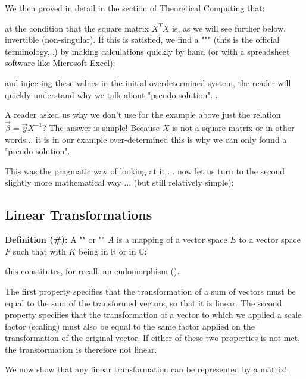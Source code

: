We then proved in detail in the section of Theoretical Computing that:
	

at the condition that the square matrix $X^TX$ is, as we will see further below, invertible (non-singular). If this is satisfied, we find a """ (this is the official terminology...) by making calculations quickly by hand (or with a spreadsheet software like Microsoft Excel):
	
and injecting these values in the initial overdetermined system, the reader will quickly understand why we talk about "pseudo-solution"...

	\begin{tcolorbox}[title=Remark,colframe=black,arc=10pt]
A reader asked us why we don't use for the example above just the relation $\vec{\beta}=\vec{y}X^{-1}$? The answer is simple! Because $X$ is not a square matrix or in other words... it is in our example over-determined this is why we can only found a "pseudo-solution".
	\end{tcolorbox}

This was the pragmatic way of looking at it ... now let us turn to the second slightly more mathematical way ... (but still relatively simple):

	\subsection{Linear Transformations}
	\textbf{Definition (\#\mydef):} A "" or "" $A$ is a mapping of a vector space $E$ to a vector space $F$ such that with $K$ being in $\mathbb{R}$ or in $\mathbb{C}$\label{linear application}:
	
	this constitutes, for recall, an endomorphism\label{matrix endomorphism} ().

The first property specifies that the transformation of a sum of vectors must be equal to the sum of the transformed vectors, so that it is linear. The second property specifies that the transformation of a vector to  which we applied a scale factor (scaling) must also be equal to the same factor applied on the transformation of the original vector. If either of these two properties is not met, the transformation is therefore not linear.

We now show that any linear transformation can be represented by a matrix!

